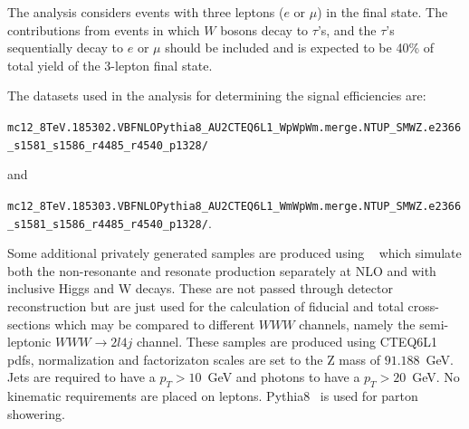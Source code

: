 The analysis considers events
with three leptons ($e$ or $\mu$) in the final state. The contributions 
from events in which $W$ bosons decay to $\tau$'s, and the $\tau$'s 
sequentially decay to $e$ or $\mu$ should be included and is expected 
to be 40\% of total yield of the 3-lepton final state.  

The datasets used in the analysis for determining the signal 
efficiencies are:\newline
\begin{footnotesize}
\texttt{mc12\_8TeV.185302.VBFNLOPythia8\_AU2CTEQ6L1\_WpWpWm.merge.NTUP\_SMWZ.e2366\_s1581\_s1586\_r4485\_r4540\_p1328/} 
\end{footnotesize}
 and  \newline
 \begin{footnotesize}
\texttt{mc12\_8TeV.185303.VBFNLOPythia8\_AU2CTEQ6L1\_WmWpWm.merge.NTUP\_SMWZ.e2366\_s1581\_s1586\_r4485\_r4540\_p1328/}.\newline
\end{footnotesize}

Some additional privately generated samples are produced 
using \madgraph~\cite{MadGraph} which simulate both the 
non-resonante and resonate production 
separately at NLO and with inclusive Higgs and W decays. These are not 
passed through detector reconstruction but are just
used for the calculation of fiducial and total cross-sections which 
may be compared to different $WWW$ channels, namely the semi-leptonic
$WWW\rightarrow 2l4j$ channel. These samples are produced using CTEQ6L1 
pdfs, normalization and factorizaton scales
are set to the Z mass of $91.188$~GeV. Jets are required to 
have a $p_{T} > 10$~GeV and photons to have a $p_{T}>20$~GeV.  
No kinematic requirements are placed on 
leptons. {\sc Pythia8}~\cite{Sjostrand:2007gs}  is used for parton showering.



